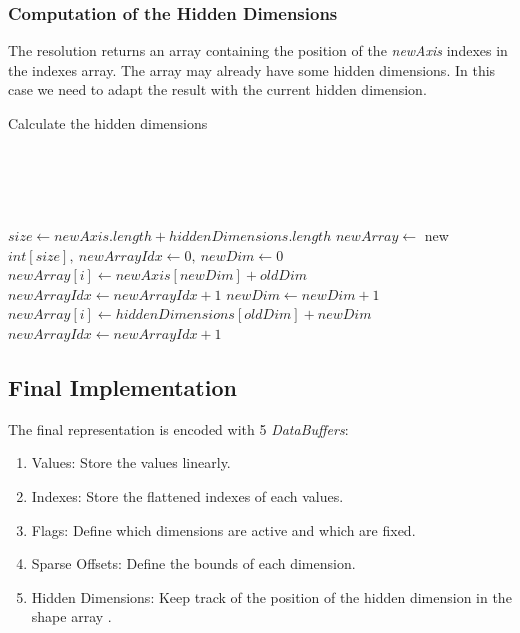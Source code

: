 \subsubsection{Computation of the Hidden Dimensions}

The resolution returns an array containing the position of the \textit{newAxis} indexes in the indexes array. The array may already have some hidden dimensions. In this case we need to adapt the result with the current hidden dimension.

\begin{algorithm}
	\caption{Calculate the hidden dimensions}
	\label{alg:hiddenDim}
	\begin{algorithmic}
			
		\\
		\\
		
		\EndIf
		\\
		\EndIf
		\\	
		
	
		\State $size\gets newAxis.length + hiddenDimensions.length$ 	
		\State $newArray \gets $ new $int[size],\ newArrayIdx\gets 0,\ newDim\gets 0$
		\\
				\State $newArray[i] \gets newAxis[newDim] + oldDim$
				\State $newArrayIdx \gets newArrayIdx + 1 $
				\State $newDim \gets newDim + 1$	
			\EndWhile
			\State $newArray[i] \gets hiddenDimensions[oldDim] + newDim$	
			\State $newArrayIdx\gets newArrayIdx + 1$
		\EndFor
		\EndProcedure
	\end{algorithmic}
\end{algorithm}






\subsection{Final Implementation}
	
	The final representation is encoded with 5 \textit{DataBuffers}:
	\begin{enumerate}
		\item Values: Store the values linearly.
		\item Indexes: Store the flattened indexes of each values.
		\item Flags: Define which dimensions are active and which are fixed.
		\item Sparse Offsets: Define the bounds of each dimension.
		\item Hidden Dimensions: Keep track of the position of the hidden dimension in the shape array .
	\end{enumerate}
	

